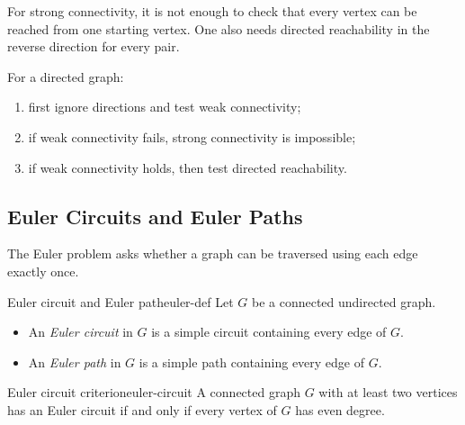 \begin{commonmistake}[title={Checking only one direction of reachability}]
For strong connectivity, it is not enough to check that every vertex can be reached from one starting vertex. One also needs directed reachability in the reverse direction for every pair.
\end{commonmistake}

\begin{examtip}[title={Fast strong/weak connectivity test}]
For a directed graph:
\begin{enumerate}[leftmargin=*]
    \item first ignore directions and test weak connectivity;
    \item if weak connectivity fails, strong connectivity is impossible;
    \item if weak connectivity holds, then test directed reachability.
\end{enumerate}
\end{examtip}

\subsection{Euler Circuits and Euler Paths}

The Euler problem asks whether a graph can be traversed using each edge exactly once.

\begin{definition}{Euler circuit and Euler path}{euler-def}
Let \(G\) be a connected undirected graph.
\begin{itemize}[leftmargin=*]
    \item An \emph{Euler circuit} in \(G\) is a simple circuit containing every edge of \(G\).
    \item An \emph{Euler path} in \(G\) is a simple path containing every edge of \(G\).
\end{itemize}
\end{definition}

\begin{theorem}{Euler circuit criterion}{euler-circuit}
A connected graph \(G\) with at least two vertices has an Euler circuit if and only if every vertex of \(G\) has even degree.
\end{theorem}

